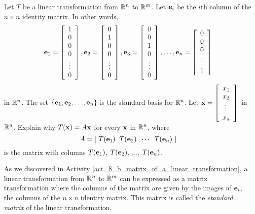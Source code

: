 \begin{activity} \label{act_8_b_matrix_of_a_linear_transformation} Let $T$ be a linear transformation from $\mathbb{R}^n$ to $\mathbb{R}^m$.  Let $\mathbf{e}_i$ be the $i$th column of the $n \times n$ identity matrix. In other words,
\[\mathbf{e}_1 = \left[ \begin{array}{c} 1 \\ 0 \\ 0 \\ 0 \\ \vdots \\ 0 \end{array} \right], \mathbf{e}_2 = \left[ \begin{array}{c} 0 \\ 1 \\ 0 \\ 0  \\ \vdots \\ 0 \end{array} \right], \mathbf{e}_3 = \left[ \begin{array}{c} 0 \\ 0 \\ 1 \\ 0 \\ \vdots \\ 0 \end{array} \right], \ldots , \mathbf{e}_n = \left[ \begin{array}{c} 0 \\ 0 \\ 0 \\ \vdots \\ 1 \end{array} \right]\]
in $\mathbb{R}^n$. The set $\{\mathbf{e}_1, \mathbf{e}_2, \ldots, \mathbf{e}_n\}$ is the standard basis for $\mathbb{R}^n$. Let $\mathbf{x} = \left[ \begin{array}{c} x_1 \\ x_2 \\ \vdots \ \\x_n \end{array} \right]$ in $\mathbb{R}^n$. Explain why 
$T(\mathbf{x}) = A \mathbf{x}$ for every $\mathbf{x}$ in $\mathbb{R}^n$, where
\[A = [\ T(\mathbf{e}_1) \; \;  T(\mathbf{e}_2)  \; \; \cdots \; \;  T(\mathbf{e}_n) \ ]\]
is the matrix with columns $T(\mathbf{e}_1)$, $T(\mathbf{e}_2)$, $\ldots$, $T(\mathbf{e}_n)$. 

\end{activity}

As we discovered in Activity \ref{act_8_b_matrix_of_a_linear_transformation}, a linear transformation from $\mathbb{R}^n$ to $\mathbb{R}^m$ can be expressed as a matrix transformation where the columns of the matrix are given by the images of $\mathbf{e}_i$, the columns of the $n\times n$ identity matrix. This matrix is called the \emph{standard matrix} of the linear transformation.

